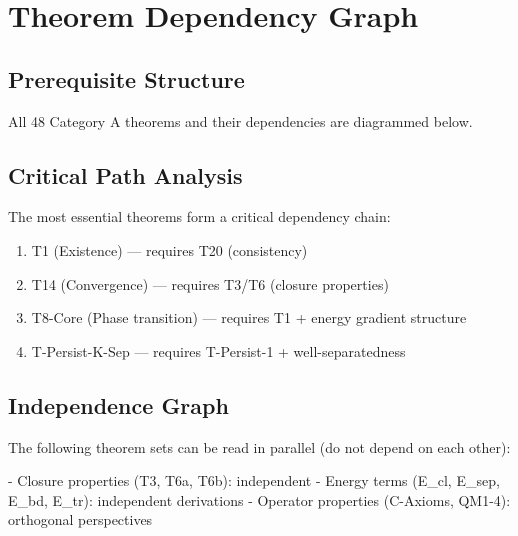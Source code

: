 \chapter{Theorem Dependency Graph}
\label{app:theorem-dag}


\section{Prerequisite Structure}

All 48 Category A theorems and their dependencies are diagrammed below.


\section{Critical Path Analysis}

The most essential theorems form a critical dependency chain:

\begin{enumerate}
  \item T1 (Existence) — requires T20 (consistency)
  \item T14 (Convergence) — requires T3/T6 (closure properties)
  \item T8-Core (Phase transition) — requires T1 + energy gradient structure
  \item T-Persist-K-Sep — requires T-Persist-1 + well-separatedness
\end{enumerate}


\section{Independence Graph}

The following theorem sets can be read in parallel (do not depend on each other):

- Closure properties (T3, T6a, T6b): independent
- Energy terms (E_cl, E_sep, E_bd, E_tr): independent derivations
- Operator properties (C-Axioms, QM1-4): orthogonal perspectives


\cleardoublepage

